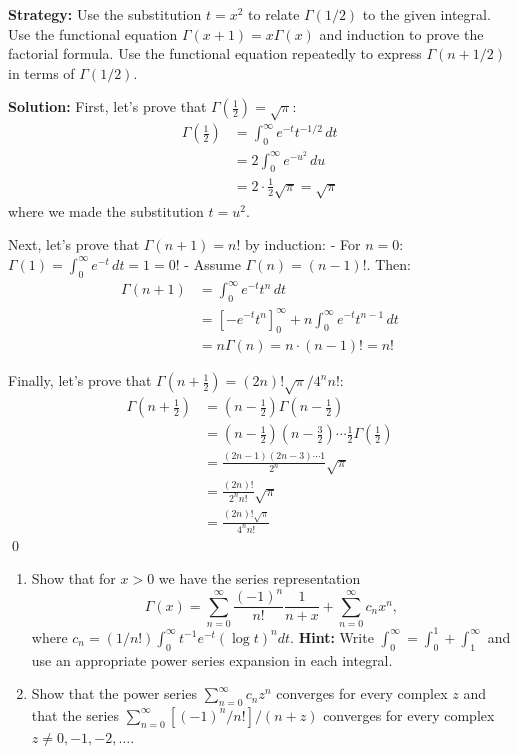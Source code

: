 \noindent\textbf{Strategy:} Use the substitution $t = x^2$ to relate $\Gamma(1/2)$ to the given integral. Use the functional equation $\Gamma(x+1) = x\Gamma(x)$ and induction to prove the factorial formula. Use the functional equation repeatedly to express $\Gamma(n + 1/2)$ in terms of $\Gamma(1/2)$.

\bigskip\noindent\textbf{Solution:}
First, let's prove that $\Gamma(\frac{1}{2}) = \sqrt{\pi}$:
\begin{align*}
\Gamma\left(\frac{1}{2}\right) &= \int_{0}^{\infty} e^{-t} t^{-1/2} \, dt \\
&= 2 \int_{0}^{\infty} e^{-u^{2}} \, du \\
&= 2 \cdot \frac{1}{2} \sqrt{\pi} = \sqrt{\pi}
\end{align*}
where we made the substitution $t = u^{2}$.

Next, let's prove that $\Gamma(n + 1) = n!$ by induction:
- For $n = 0$: $\Gamma(1) = \int_{0}^{\infty} e^{-t} \, dt = 1 = 0!$
- Assume $\Gamma(n) = (n-1)!$. Then:
\begin{align*}
\Gamma(n + 1) &= \int_{0}^{\infty} e^{-t} t^{n} \, dt \\
&= \left[-e^{-t} t^{n}\right]_{0}^{\infty} + n \int_{0}^{\infty} e^{-t} t^{n-1} \, dt \\
&= n \Gamma(n) = n \cdot (n-1)! = n!
\end{align*}

Finally, let's prove that $\Gamma(n + \frac{1}{2}) = (2n)! \sqrt{\pi}/4^{n}n!$:
\begin{align*}
\Gamma\left(n + \frac{1}{2}\right) &= \left(n - \frac{1}{2}\right) \Gamma\left(n - \frac{1}{2}\right) \\
&= \left(n - \frac{1}{2}\right) \left(n - \frac{3}{2}\right) \cdots \frac{1}{2} \Gamma\left(\frac{1}{2}\right) \\
&= \frac{(2n-1)(2n-3) \cdots 1}{2^{n}} \sqrt{\pi} \\
&= \frac{(2n)!}{2^{n} n!} \sqrt{\pi} \\
&= \frac{(2n)! \sqrt{\pi}}{4^{n} n!}
\end{align*}\qed


\begin{problembox}
\begin{enumerate}[label=(\alph*)]
\item Show that for $x > 0$ we have the series representation
\[\Gamma(x) = \sum_{n=0}^{\infty} \frac{(-1)^n}{n!} \frac{1}{n + x} + \sum_{n=0}^{\infty} c_n x^n,\]
where $c_n = (1/n!) \int_0^\infty t^{-1} e^{-t} (\log t)^n dt$. \textbf{Hint:} Write $\int_0^\infty = \int_0^1 + \int_1^\infty$ and use an appropriate power series expansion in each integral.
\item Show that the power series $\sum_{n=0}^{\infty} c_n z^n$ converges for every complex $z$ and that the series $\sum_{n=0}^{\infty} [(-1)^n / n!]/(n + z)$ converges for every complex $z \neq 0, -1, -2, \ldots$.
\end{enumerate}
\end{problembox}

